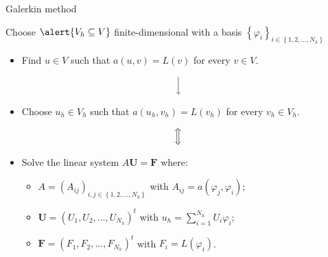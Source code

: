 \begin{frame}{Galerkin method}
	\begin{block}{}
	\begin{center}
	Choose $\alert{V_h\subseteq V}$ finite-dimensional with a basis $\left\{\varphi_i\right\}_{i\in\left\{1,2,\ldots,N_h \right\}}$
	\end{center}
	\end{block}
	
	\vspace*{-0.3cm}
	\begin{itemize}
	\item Find $u\in V$ such that $a(u,v)=L(v)$ for every $v\in V$.
	\end{itemize}
	\vspace*{0.1cm}
	$$\Big{\downarrow}$$
	\vspace*{-0.3cm}
	\begin{itemize}
	\item Choose $u_h\in V_h$ such that $a(u_h,v_h)=L(v_h)$ for every $v_h\in V_h$.
	\end{itemize}
	\vspace*{0.1cm}
	$$\Big{\Updownarrow}$$
	\vspace*{-0.3cm}
	\begin{itemize}
	\item Solve the linear system $A\mathbf{U}=\mathbf{F}$ where:
	\vspace*{0.3cm}
	\begin{itemize}
		\item $A=\left(A_{i j}\right)_{i, j\in\left\{1,2,\ldots,N_h\right\}}$ with $A_{i j}=a(\varphi_j,\varphi_i)$;
		\item $\mathbf{U}=\left(U_1,U_2,\ldots,U_{N_h}\right)^t$ with $u_h=\displaystyle\sum_{i=1}^{N_h}U_i\varphi_i$;
		\item $\mathbf{F}=\left(F_1,F_2,\ldots,F_{N_h}\right)^t$ with $F_i=L\left(\varphi_i\right)$.
	\end{itemize}
	\end{itemize}
\end{frame}
	
	
